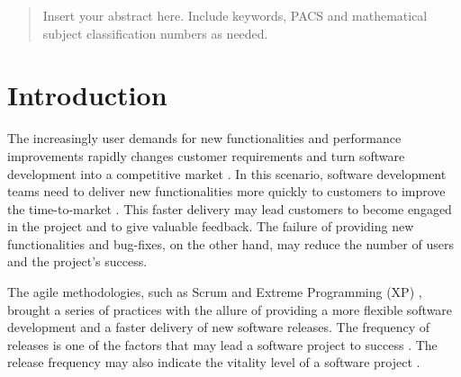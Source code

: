 	
	
	\date{Received: date / Accepted: date}
	
	
	\maketitle
	
	\begin{abstract}
		Insert your abstract here. Include keywords, PACS and mathematical
		subject classification numbers as needed.
	\end{abstract}

	\section{Introduction}
	The increasingly user demands for new functionalities and performance
	improvements rapidly changes customer requirements and turn software development
	into a competitive market \cite{Wnuk2013-ju}. In this scenario, 
	software development teams need to deliver new functionalities more quickly to
	customers to improve the time-to-market \cite{Debbiche2014,
		Laukkanen2015-ab}. This faster delivery may lead customers to become engaged in
	the project and to give valuable feedback. The failure of providing new
	functionalities and bug-fixes, on the other hand, may reduce the number of users
	and the project's success.
	
	The agile methodologies, such as Scrum
	\cite{Schwaber1997-cc} and Extreme Programming (XP) \cite{Beck2000-ja}, brought
	a series of practices with the allure of providing a more flexible software
	development and a faster delivery of new software releases. The frequency of
	releases is one of the factors that may lead a software project to success
	\cite{Chen2005-jd,Wohlin1995-wg}. The release frequency may also indicate the
	vitality level of a software project \cite{Crowston2003-ig}.
	

